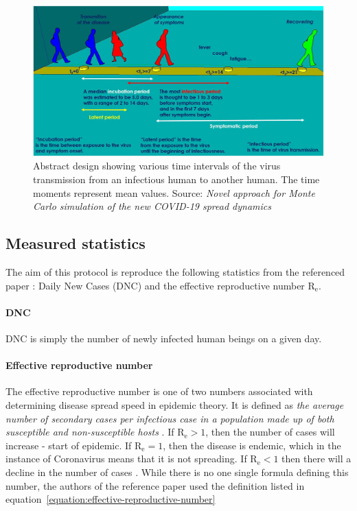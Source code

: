 \documentclass[a4paper]{article}
\begin{document}
\begin{figure}[h!]
	\centering
	\includegraphics{images/covid19_spread_dynamics.jpg}
	\caption{Abstract design showing various time intervals of the virus transmission from an infectious human to another human. The time moments represent mean values. Source: \textit{Novel approach for Monte Carlo simulation of the new COVID-19 spread dynamics} \cite{Maltezos2021}}
	\label{figure:covid-spread-dynamics}
\end{figure}



\subsection{Measured statistics}
The aim of this protocol is reproduce the following statistics from the referenced paper \cite{Maltezos2021}: Daily New Cases (DNC) and the effective reproductive number $\textrm{R}_\textrm{e}$.

\paragraph{DNC}
DNC is simply the number of newly infected human beings on a given day.

\paragraph{Effective reproductive number}
The effective reproductive number is one of two numbers associated with determining disease spread speed in epidemic theory. It is defined as \textit{the average number of secondary cases per infectious case in a population made up of both susceptible and non-susceptible hosts} \cite{Barratt2018}. If $\textrm{R}_\textrm{e} > 1$, then the number of cases will increase - start of epidemic. If $\textrm{R}_\textrm{e} = 1$, then the disease is endemic, which in the instance of Coronavirus means that it is not spreading. If $\textrm{R}_\textrm{e} < 1$ then there will a decline in the number of cases \cite{Barratt2018}. While there is no one single formula defining this number, the authors of the reference paper \cite{Maltezos2021} used the definition listed in equation~\ref{equation:effective-reproductive-number}
\end{document}

